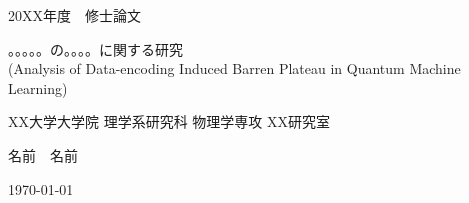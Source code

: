 \begin{titlepage}
    \begin{center}        
        \vspace*{3cm}
        
        {\Large 20XX年度　修士論文}
        \vspace{5cm}
 
        {\Large 。。。。。の。。。。に関する研究\\}
        \vspace{0.5cm}
        {\fontsize{15pt}{0cm}\selectfont (Analysis of Data-encoding Induced Barren Plateau in Quantum Machine Learning)}
        
        
        \vspace{5cm}
        
        \vfill
        
        {\large XX大学大学院 理学系研究科 物理学専攻 XX研究室}
        
        \vspace{0.5cm}
        {\Large 名前　名前}
        
        \vspace{1cm}
        {\Large \today}
        
    \end{center}
\end{titlepage}
\restoregeometry